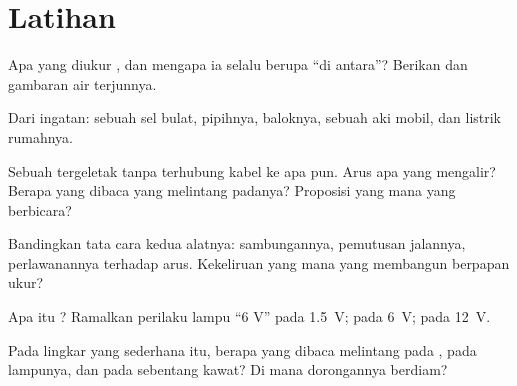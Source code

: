 \section{Latihan}

\begin{exercise}[$\star$]\label{exo:g8:voltage-voltmeter:1}
Apa yang diukur , dan mengapa ia selalu berupa ``di antara''?
Berikan  dan gambaran air terjunnya.
\end{exercise}

\begin{exercise}[$\star$]\label{exo:g8:voltage-voltmeter:2}
Dari ingatan:  sebuah sel bulat,  pipihnya, 
baloknya, sebuah aki mobil, dan listrik rumahnya.
\end{exercise}

\begin{exercise}[$\star$]\label{exo:g8:voltage-voltmeter:3}
Sebuah  tergeletak tanpa terhubung kabel ke apa pun. Arus apa
yang mengalir? Berapa yang dibaca  yang melintang padanya?
Proposisi yang mana yang berbicara?
\end{exercise}

\begin{exercise}[$\star$]\label{exo:g8:voltage-voltmeter:4}
Bandingkan tata cara kedua alatnya: sambungannya, pemutusan jalannya,
perlawanannya terhadap arus. Kekeliruan yang mana yang membangun
 berpapan ukur?
\end{exercise}

\begin{exercise}[$\star$]\label{exo:g8:voltage-voltmeter:5}
Apa itu ? Ramalkan perilaku lampu ``6 V'' pada
\qty{1.5}{V}; pada \qty{6}{V}; pada \qty{12}{V}.
\end{exercise}

\begin{exercise}[$\star$]\label{exo:g8:voltage-voltmeter:6}
Pada lingkar yang sederhana itu, berapa yang dibaca 
melintang pada , pada lampunya, dan pada sebentang kawat? Di
mana dorongannya berdiam?
\end{exercise}

